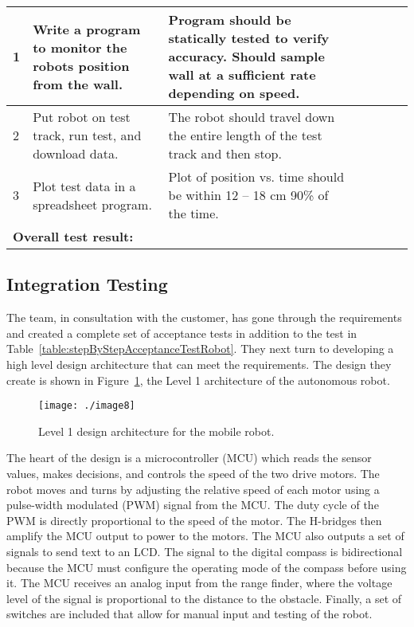 \begin{table}[h]
\begin{tabular}{|m{1cm}|m{2cm}|m{3cm}|m{0.5cm}|m{0.5cm}|m{0.5cm}|m{1cm}|m{1cm}|}
1 & Write a program to monitor the robots position from the wall. &
Program should be statically tested to verify accuracy. Should sample
wall at a sufficient rate depending on speed. & & & &\multicolumn{2}{l|}{}\\ \hline
2 & Put robot on test track, run test, and download data. & The robot
should travel down the entire length of the test track and then stop. & & & &\multicolumn{2}{l|}{}\\ \hline
3 & Plot test data in a spreadsheet program. & Plot of position vs. time
should be within 12 -- 18 cm 90\% of the time. & & & &\multicolumn{2}{l|}{}\\ \hline

\multicolumn{3}{|l|}{\textbf{Overall test result:}} &   &  &  & \multicolumn{2}{l|}{}\\ \hline
\end{tabular}
\end{table}

\subsection*{Integration Testing}
\label{subsection:integration-testing-1}

The team, in consultation with the customer, has gone through the
requirements and created a complete set of acceptance tests in addition
to the test in Table~\ref{table:stepByStepAcceptanceTestRobot}. 
They next turn to developing a high level
design architecture that can meet the requirements. The design they
create is shown in 
Figure~\ref{figure:level1mobileRobot}, the Level 1 architecture of the
autonomous robot.


\begin{figure}[h]
\centering
\texttt{[image: ./image8]}
\caption{Level 1 design architecture for the mobile robot.}
\label{figure:level1mobileRobot}
\end{figure}

The heart of the design is a microcontroller (MCU) which reads the
sensor values, makes decisions, and controls the speed of the two drive
motors. The robot moves and turns by adjusting the relative speed of
each motor using a pulse-width modulated (PWM) signal from the MCU. The
duty cycle of the PWM is directly proportional to the speed of the
motor. The H-bridges then amplify the MCU output to power to the motors.
The MCU also outputs a set of signals to send text to an LCD. The signal
to the digital compass is bidirectional because the MCU must configure
the operating mode of the compass before using it. The MCU receives an
analog input from the range finder, where the voltage level of the
signal is proportional to the distance to the obstacle. Finally, a set
of switches are included that allow for manual input and testing of the
robot.

